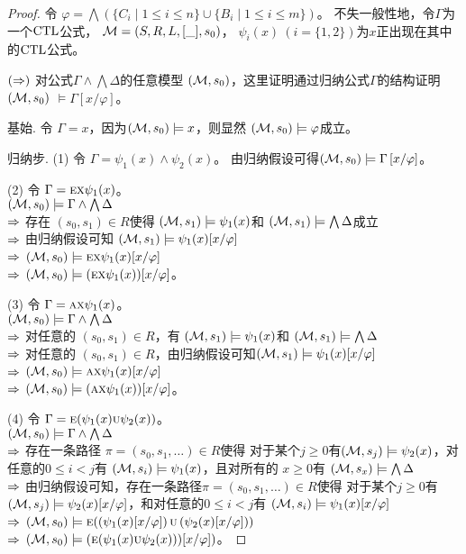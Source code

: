 \begin{proof}
	令 $\varphi = \bigwedge\left(\{C_i\mid 1\le i\le n\}\cup\{B_i\mid 1\le i\le m\}\right)$。
	不失一般性地，令$\Gamma$为一个$\textrm{CTL}$公式， ${\cal M}=(S,R,L,[\_],s_0)$， $\psi_i(x)~(i=\{1,2\})$为$x$正出现在其中的$\textrm{CTL}$公式。
	
	$(\Rightarrow)$ 对公式$\Gamma \wedge \bigwedge \Delta$的任意模型 $({\cal M}, s_0)$，这里证明通过归纳公式$\Gamma$的结构证明 $({\cal M}, s_0)$ $\models\Gamma\left[x/\varphi \right]$。
	
	基始. 令 $\Gamma = x$，因为$({\cal M}, s_0)\models x$，则显然 $({\cal M}, s_0)\models \varphi$成立。
	
	归纳步. (1) 令 $\Gamma= \psi_1(x) \wedge \psi_2(x)$。
	由归纳假设可得$({\cal M}, s_0)\models \Gamma\left[x/\varphi \right]$。
	
	(2) 令 $\Gamma = \textsc{e}\textsc{x} \psi_1(x)$。 \\
	$({\cal M},s_0)\models \Gamma \wedge \bigwedge \Delta$\\
	$\Rightarrow$ 存在 $(s_0, s_1)\in R$使得 $({\cal M},s_1) \models \psi_1(x)$和 $({\cal M},s_1) \models \bigwedge \Delta$成立\\
	$\Rightarrow$ 由归纳假设可知 $({\cal M},s_1) \models \psi_1(x)[x/\varphi]$\\
	$\Rightarrow$ $({\cal M},s_0)\models \textsc{e}\textsc{x} \psi_1(x)[x/\varphi]$\\
	$\Rightarrow$ $({\cal M},s_0)\models (\textsc{e}\textsc{x} \psi_1(x))[x/\varphi]$。
	
	(3) 令 $\Gamma = \textsc{a}\textsc{x} \psi_1(x)$。 \\
	$({\cal M},s_0)\models \Gamma \wedge \bigwedge \Delta$\\
	$\Rightarrow$ 对任意的 $(s_0, s_1)\in R$，有 $({\cal M},s_1) \models \psi_1(x)$和 $({\cal M},s_1) \models \bigwedge \Delta$\\
	$\Rightarrow$  对任意的 $(s_0, s_1)\in R$，由归纳假设可知$({\cal M},s_1) \models \psi_1(x)[x/\varphi]$\\
	$\Rightarrow$ $({\cal M},s_0)\models \textsc{a}\textsc{x} \psi_1(x)[x/\varphi]$\\
	$\Rightarrow$ $({\cal M},s_0)\models (\textsc{a}\textsc{x} \psi_1(x))[x/\varphi]$。
	
	(4) 令 $\Gamma = \textsc{e}(\psi_1(x) \textsc{u} \psi_2(x))$。 \\
	$({\cal M},s_0)\models \Gamma \wedge \bigwedge \Delta$\\
	$\Rightarrow$ 存在一条路径 $\pi=(s_0, s_1, \dots)\in R$使得 对于某个$j \geq 0$有$({\cal M},s_j) \models \psi_2(x)$，对任意的$0\leq i < j$有 $({\cal M},s_i) \models \psi_1(x)$，且对所有的 $x \geq 0$有 $({\cal M},s_x) \models \bigwedge \Delta$\\
	$\Rightarrow$ 由归纳假设可知，存在一条路径$\pi=(s_0, s_1, \dots)\in R$使得 对于某个$j \geq 0$有$({\cal M},s_j) \models \psi_2(x)[x/\varphi]$，和对任意的$0\leq i < j$有 $({\cal M},s_i) \models \psi_1(x)[x/\varphi]$\\
	$\Rightarrow$ $({\cal M},s_0)\models \textsc{e}(\left(\psi_1(x)[x/\varphi]\right) \textsc{u} \left(\psi_2(x)[x/\varphi]\right))$\\
	$\Rightarrow$ $({\cal M},s_0)\models \left(\textsc{e}(\psi_1(x) \textsc{u} \psi_2(x)))[x/\varphi]\right)$。
	

\end{proof}
